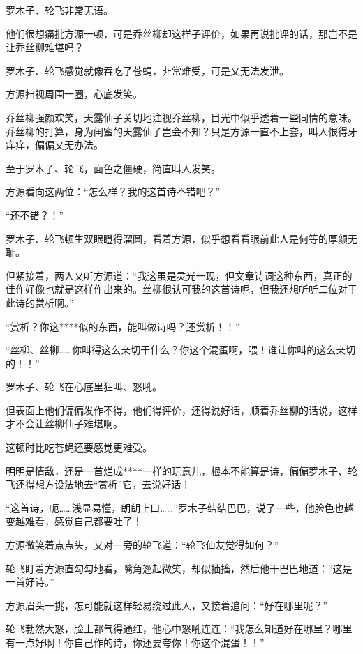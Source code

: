 
\begin{this_body}

罗木子、轮飞非常无语。

他们很想痛批方源一顿，可是乔丝柳却这样子评价，如果再说批评的话，那岂不是让乔丝柳难堪吗？

罗木子、轮飞感觉就像吞吃了苍蝇，非常难受，可是又无法发泄。

方源扫视周围一圈，心底发笑。

乔丝柳强颜欢笑，天露仙子关切地注视乔丝柳，目光中似乎透着一些同情的意味。乔丝柳的打算，身为闺蜜的天露仙子岂会不知？只是方源一直不上套，叫人恨得牙痒痒，偏偏又无办法。

至于罗木子、轮飞，面色之僵硬，简直叫人发笑。

方源看向这两位：“怎么样？我的这首诗不错吧？”

“还不错？！”

罗木子、轮飞顿生双眼瞪得溜圆，看着方源，似乎想看看眼前此人是何等的厚颜无耻。

但紧接着，两人又听方源道：“我这虽是灵光一现，但文章诗词这种东西，真正的佳作好像也就是这样作出来的。丝柳很认可我的这首诗呢，但我还想听听二位对于此诗的赏析啊。”

“赏析？你这****似的东西，能叫做诗吗？还赏析！！”

“丝柳、丝柳……你叫得这么亲切干什么？你这个混蛋啊，喂！谁让你叫的这么亲切的！！”

罗木子、轮飞在心底里狂叫、怒吼。

但表面上他们偏偏发作不得，他们得评价，还得说好话，顺着乔丝柳的话说，这样才不会让丝柳仙子难堪啊。

这顿时比吃苍蝇还要感觉更难受。

明明是情敌，还是一首烂成****一样的玩意儿，根本不能算是诗，偏偏罗木子、轮飞还得想方设法地去“赏析”它，去说好话！

“这首诗，呃……浅显易懂，朗朗上口……”罗木子结结巴巴，说了一些，他脸色也越变越难看，感觉自己都要吐了！

方源微笑着点点头，又对一旁的轮飞道：“轮飞仙友觉得如何？”

轮飞盯着方源直勾勾地看，嘴角翘起微笑，却似抽搐，然后他干巴巴地道：“这是一首好诗。”

方源眉头一挑，怎可能就这样轻易绕过此人，又接着追问：“好在哪里呢？”

轮飞勃然大怒，脸上都气得通红，他心中怒吼连连：“我怎么知道好在哪里？哪里有一点好啊！你自己作的诗，你还要夸你！你这个混蛋！！”


\end{this_body}
